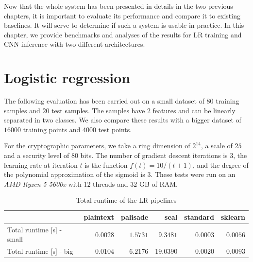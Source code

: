 \documentclass[a4paper,11pt,oneside]{report}
\begin{document}
Now that the whole system has been presented in details in the two previous chapters, it is important to evaluate its performance and compare it to existing baselines.
It will serve to determine if such a system is usable in practice.
In this chapter, we provide benchmarks and analyses of the results for LR training and CNN inference with two different architectures.


\section{Logistic regression}\label{sec:eval_lr}

The following evaluation has been carried out on a small dataset of $80$ training samples and $20$ test samples. 
The samples have $2$ features and can be linearly separated in two classes.
We also compare these results with a bigger dataset of $16000$ training points and $4000$ test points.

For the cryptographic parameters, we take a ring dimension of $2^{14}$, a scale of $25$ and a security level of $80$ bits. 
The number of gradient descent iterations is $3$, the learning rate at iteration $t$ is the function $f(t) = 10 / (t+1)$, and the degree of the polynomial approximation of the sigmoid is $3$.
These tests were run on an \emph{AMD Ryzen 5 5600x} with $12$ threads and $32$ GB of RAM.

\begin{table}[h!]
  \begin{center}
    \caption{Total runtime of the LR pipelines}
    \label{table:lr_runtime}
    \vspace*{2mm}
    \begin{tabular}{ l r r r r r }
    \hline
     & plaintext & palisade & seal & standard & sklearn \\
    \hline
    Total runtime [s] - small & $0.0028$ & $1.5731$ & $9.3481$ & $0.0003$ & $0.0056$ \\
    Total runtime [s] - big & $0.0104$ & $6.2176$ & $19.0390$ & $0.0020$ & $0.0093$ \\
    \hline
    \end{tabular}
  \end{center}
\end{table}
\end{document}
